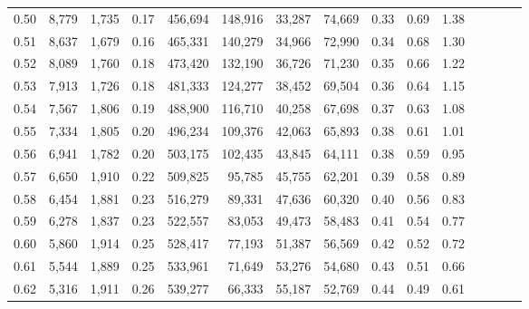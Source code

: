 \begin{tabular}{rrrcrrrrrrrrrrr}
0.50 &   8,779 &  1,735 &                                       0.17 &  456,694 &  148,916 &   33,287 &   74,669 &  0.33 &  0.69 &                         1.38 \\
0.51 &   8,637 &  1,679 &                                       0.16 &  465,331 &  140,279 &   34,966 &   72,990 &  0.34 &  0.68 &                         1.30 \\
0.52 &   8,089 &  1,760 &                                       0.18 &  473,420 &  132,190 &   36,726 &   71,230 &  0.35 &  0.66 &                         1.22 \\
0.53 &   7,913 &  1,726 &                                       0.18 &  481,333 &  124,277 &   38,452 &   69,504 &  0.36 &  0.64 &                         1.15 \\
0.54 &   7,567 &  1,806 &                                       0.19 &  488,900 &  116,710 &   40,258 &   67,698 &  0.37 &  0.63 &                         1.08 \\
0.55 &   7,334 &  1,805 &                                       0.20 &  496,234 &  109,376 &   42,063 &   65,893 &  0.38 &  0.61 &                         1.01 \\
0.56 &   6,941 &  1,782 &                                       0.20 &  503,175 &  102,435 &   43,845 &   64,111 &  0.38 &  0.59 &                         0.95 \\
0.57 &   6,650 &  1,910 &                                       0.22 &  509,825 &   95,785 &   45,755 &   62,201 &  0.39 &  0.58 &                         0.89 \\
0.58 &   6,454 &  1,881 &                                       0.23 &  516,279 &   89,331 &   47,636 &   60,320 &  0.40 &  0.56 &                         0.83 \\
0.59 &   6,278 &  1,837 &                                       0.23 &  522,557 &   83,053 &   49,473 &   58,483 &  0.41 &  0.54 &                         0.77 \\
0.60 &   5,860 &  1,914 &                                       0.25 &  528,417 &   77,193 &   51,387 &   56,569 &  0.42 &  0.52 &                         0.72 \\
0.61 &   5,544 &  1,889 &                                       0.25 &  533,961 &   71,649 &   53,276 &   54,680 &  0.43 &  0.51 &                         0.66 \\
0.62 &   5,316 &  1,911 &                                       0.26 &  539,277 &   66,333 &   55,187 &   52,769 &  0.44 &  0.49 &                         0.61 \\

\end{tabular}
